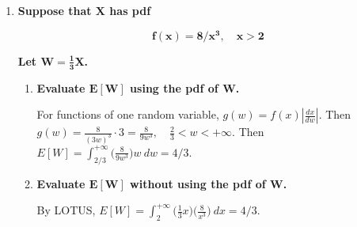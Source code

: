 \documentclass[10pt, oneside]{article}
\begin{document}
\begin{enumerate}[label=7.\arabic*]
\begin{enumerate}
\begin{enumerate}
		By premise, independence of $X,Y$ implies $f(x,y) = g(x) h(y)$. Then by LOTUS,
		
		\[ E[Z] = \int^{+\infty}_2 \int^1_0 (xy) \Big( \frac{8}{x^3} \Big) (2y) \ dy dx = \boxed{\frac{8}{3}} \]
		
		\item  \begin{tcolorbox}[
		  colback=Cerulean!5!white,
		  colframe=Cerulean!75!black]
		\textbf{Directly, without using the pdf of $\bm{Z}$.}
		\end{tcolorbox}
		
		Using $P(Z)$, we calculate
		
		\[ E[Z] = \int^2_0 z \Big( \frac{z}{4} \Big) \ dz + \int^{+\infty}_2 z \Big( \frac{4}{z^3} \Big) \ dz = \boxed{\frac{8}{3}} \]
		
		\end{enumerate}
	\end{enumerate}

\item  \begin{tcolorbox}[
  colback=Cerulean!5!white,
  colframe=Cerulean!75!black]
  \textbf{Suppose that $\bm{X}$ has pdf}
  
  \[ \bm{ f(x) = 8/x^3, \quad x > 2} \]
  
  \textbf{Let $\bm{W = \frac{1}{3}X}$.}
\end{tcolorbox}

	\begin{enumerate}
	\item  \begin{tcolorbox}[
	  colback=Cerulean!5!white,
	  colframe=Cerulean!75!black]
	\textbf{Evaluate $\bm{E[W]}$ using the pdf of $\bm{W}$.}
	\end{tcolorbox}

	For functions of one random variable, $g(w) = f(x) | \frac{dx}{dw} |$. Then $g(w) = \frac{8}{(3w)^3} \cdot 3 = \frac{8}{9w^3}, \quad \frac{2}{3} < w < +\infty$. Then $E[W] = \int^{+\infty}_{2/3} \big( \frac{8}{9w^3} \big) w \ dw = \boxed{4/3}$.
	
	\item  \begin{tcolorbox}[
	  colback=Cerulean!5!white,
	  colframe=Cerulean!75!black]
	\textbf{Evaluate $\bm{E[W]}$ without using the pdf of $\bm{W}$.}
	\end{tcolorbox}
	
	By LOTUS, $E[W] = \int^{+\infty}_2 \big( \frac{1}{3}x \big) \big( \frac{8}{x^3} \big) \ dx = \boxed{4/3}$.
	\end{enumerate}


\end{enumerate}
\end{document}
